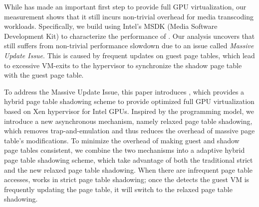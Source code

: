 \iffalse
\hspace{0pt}
In order to compare the performance of different solutions, many GPU benchmarks have been introduced, although they normally focus on the graphics ability of cards~{\cite{website:3dmark}}. As \gpu{} has been applied in the filed of generous purpose computing, there are some tools implemented to measure the performance on GPGPU applications, such as Rodinia~{\cite{che2009rodinia}} and Parboil~{\cite{stratton2012parboil}}. With the growing demand of hosting online video stream, \gpu{}'s media performance has become another concern for service providers. For example, video sharing websites like YouTube need to transcode user-uploaded video into different qualities to offer smooth playback experience. However, there is no benchmark for this specific workload and most media processing applications just use CPU instructions instead of \gpu{}.

\fi

While \gvirt{} has made an important first step to provide full GPU virtualization,
our measurement shows that it still incurs non-trivial overhead for media transcoding workloads.
Specifically, we build \benchmark{} using Intel's MSDK (Media Software Development Kit)
to characterize the performance of \gvirt{}. Our analysis uncovers that \gvirt{} still suffers from
non-trivial performance slowdown due to an issue called \textit{Massive Update Issue}.
This is caused by frequent updates on guest page tables, which lead to 
excessive VM-exits
to the hypervisor to synchronize the shadow page table with the guest page table.

To address the Massive Update Issue, this paper introduces \name{}, which provides a hybrid page table shadowing 
scheme to provide optimized full GPU virtualization based on Xen hypervisor for Intel GPUs. Inspired by the \gpu{} 
programming model, we introduce a new asynchronous mechanism, namely relaxed page table shadowing, 
which removes trap-and-emulation and thus reduces the overhead of massive page table's modifications. 
To minimize the overhead of making guest and shadow page tables consistent, we combine the two mechanisms 
into a adaptive hybrid page table shadowing scheme, which take advantage of both the traditional strict and 
the new relaxed page table shadowing. When there are infrequent page table accesses, 
\name{} works in strict page table shadowing; once the \name{} detects the guest VM is frequently updating 
the page table, it will switch to the relaxed page table shadowing.

